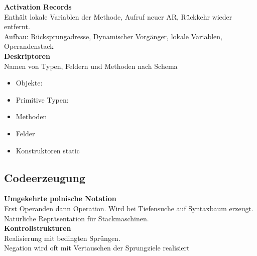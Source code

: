 \textbf{Activation Records}\\
Enthält lokale Variablen der Methode, Aufruf neuer AR, Rückkehr wieder entfernt.\\
Aufbau: Rücksprungadresse, Dynamischer Vorgänger, lokale Variablen, Operandenstack\\

\textbf{Deskriptoren}\\
Namen von Typen, Feldern und Methoden nach Schema
\begin{itemize}
\item Objekte: 
\item Primitive Typen: 
\item Methoden 
\item Felder 
\item Konstruktoren  static 
\end{itemize}

\subsection{Codeerzeugung}%
\label{cmp:sub:codeerzeugung}
\textbf{Umgekehrte polnische Notation}\\
Erst Operanden dann Operation. Wird bei Tiefensuche auf Syntaxbaum erzeugt.
Natürliche Repräsentation für Stackmaschinen.\\

\textbf{Kontrollstrukturen}\\
Realisierung mit bedingten Sprüngen.\\
Negation wird oft mit Vertauschen der Sprungziele realisiert
